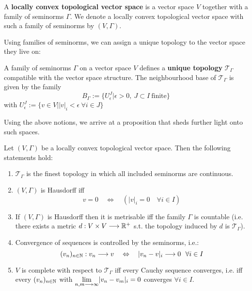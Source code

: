 \begin{definition}
\label{def:Locally_convex}
  A \textbf{locally convex topological vector space} is a vector space $V$ together with a family of seminorms $\Gamma$. We denote a locally convex topological vector space with such a family of seminorms by $(V, \Gamma)$.
\end{definition}

Using families of seminorms, we can assign a unique topology to the vector space they live on:

\begin{definition}
  A family of seminorms $\Gamma$ on a vector space $V$ defines a \textbf{unique topology} $\mathcal{T}_\Gamma$ compatible with the vector space structure. The neighbourhood base of $\mathcal{T}_\Gamma$ is given by the family
  $$ B_\Gamma := \{ U^J_\epsilon | \epsilon > 0, \ J \subset I \ \text{finite} \} $$
  with $U^J_\epsilon := \{ v \in V \big| |v|_i < \epsilon \ \forall i \in J \}$
\end{definition}

Using the above notions, we arrive at a proposition that sheds further light onto such spaces.

\begin{prop}
  Let $(V,\Gamma)$ be a locally convex topological vector space. Then the following statements hold:
  \begin{enumerate}
    \item $\mathcal{T}_\Gamma$ is the finest topology in which all included seminorms are continuous.

    \item $(V, \Gamma)$ is Hausdorff iff
    $$ v = 0 \quad \Leftrightarrow \quad \left( |v|_i = 0 \quad \forall i \in I\right)$$

    \item If $(V, \Gamma)$ is Hausdorff then it is metrisable iff the family $\Gamma$ is countable (i.e. there exists a metric $d:V\times V \longrightarrow \mathbb{R}^+$ s.t. the topology induced by $d$ is $\mathcal{T}_\Gamma$).

    \item Convergence of sequences is controlled by the seminorms, i.e.:
    $$ (v_n)_{n\in\mathbb{N}} : v_n \longrightarrow v \quad \Leftrightarrow \quad |v_n - v|_i \longrightarrow 0 \ \ \forall i \in I $$

    \item $V$ is complete with respect to $\mathcal{T}_\Gamma$ iff every Cauchy sequence converges, i.e. iff every $(v_n)_{n\in\mathbb{N}}$ with $\underset{n,m \longrightarrow \infty}{\lim} |v_n - v_m|_i = 0$ converges $\forall i \in I$.
  \end{enumerate}
\end{prop}

